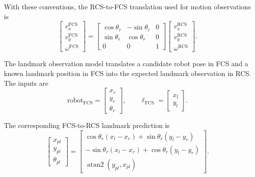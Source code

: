 With these conventions, the RCS-to-FCS translation used for motion observations is
\begin{equation}
    \begin{bmatrix}
        v_x^{\mathrm{FCS}} \\
        v_y^{\mathrm{FCS}} \\
        \omega^{\mathrm{FCS}}
    \end{bmatrix}
    =
    \begin{bmatrix}
        \cos\theta_r & -\sin\theta_r & 0 \\
        \sin\theta_r & \cos\theta_r & 0 \\
        0 & 0 & 1
    \end{bmatrix}
    \begin{bmatrix}
        v_x^{\mathrm{RCS}} \\
        v_y^{\mathrm{RCS}} \\
        \omega^{\mathrm{RCS}}
    \end{bmatrix}.
    \label{eq:fcs-rcs-motion-transform}
\end{equation}

The landmark observation model translates a candidate robot pose in FCS and a known landmark position in FCS into the expected landmark observation in RCS. The inputs are
\begin{equation}
    \mathrm{robot}_{\mathrm{FCS}}
    =
    \begin{bmatrix}
        x_r \\
        y_r \\
        \theta_r
    \end{bmatrix},
    \qquad
    \ell_{\mathrm{FCS}}
    =
    \begin{bmatrix}
        x_l \\
        y_l
    \end{bmatrix}.
    \label{eq:landmark-inputs-fcs}
\end{equation}

The corresponding FCS-to-RCS landmark prediction is
\begin{equation}
    \begin{bmatrix}
        x_{pl} \\
        y_{pl} \\
        \theta_{pl}
    \end{bmatrix}
    =
    \begin{bmatrix}
        \cos\theta_r (x_l-x_r) + \sin\theta_r (y_l-y_r) \\
        -\sin\theta_r (x_l-x_r) + \cos\theta_r (y_l-y_r) \\
        \operatorname{atan2}(y_{pl},x_{pl})
    \end{bmatrix}.
    \label{eq:fcs-to-rcs}
\end{equation}

